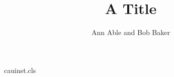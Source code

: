 \begin{filecontents*}[overwrite]{cauinst.cls}
\def\institute#1{\gdef\@institute{\it #1}}
\def\@maketitle{\begin{center}{\LARGE\@title\par}\vskip1em{\large\@author\par}\end{center}
  {\small\begingroup\def\and{\par\noindent}\noindent\@institute\par\endgroup}\vskip1em}
\end{filecontents*}
\documentclass{cauinst}


\title{A Title}
\author{Ann Able and Bob Baker}
\maketitle
Text.

